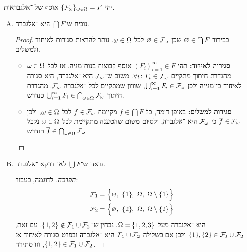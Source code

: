 \documentclass[]{../../../../tex/classes/homework}
\begin{document}
	\section{}
	יהי $\{\mathcal{F}_\omega\}_{\omega \in \Omega} = F$ אוסף של \ס־אלגבראות. 
	\begin{enumerate}[(A)]
		\item נוכיח ש־$\bigcap F$ היא \ס־אלגברה. \begin{proof}
			בבירור $\varnothing \in \bigcap F$ שכן $\varnothing \in \mathcal{F}_\omega$ לכל $\omega \in \Omega$. נותר להראות סגירות לאיחוד ולמשלים. 
			\begin{itemize}
				\item \textbf{סגירות לאיחוד: }תהי $(F_i)_{i =1}^{\infty} \in F$ אוסף קבוצות בנות־מניה. אז לכל $\omega \in \Omega $ מהגדרת חיתוך מתקיים $\forall i \colon F_i \in \mathcal{F}_\omega$. משום ש־$\mathcal{F}_\omega$ היא \ס־אלגברה, היא סגורה לאיחוד בן־מנייה ולכן $\bigcup_{i  = 1}^{\infty}F_i \in \mathcal{F}_\omega$, שוויון שמתקיים לכל \ס־אלגברה $\mathcal{F}_\omega$. מהגדרת חיתוך $\bigcup_{i = 1}^{\infty} F_i \in \bigcap_{\omega \in \Omega}\mathcal{F}_\omega $ כנדרש. 
				\item \textbf{סגירות למשלים: }באופן דומה, כל $f \in \bigcap F$ מקיימת $f \in \mathcal{F}_\omega$ לכל $\omega \in \Omega$, ולכן $\overline{f} \in \mathcal{F}_\omega$ כי $\mathcal{F}_\omega$ היא \ס־אלגברה, ולסיום משום שהטענה מתקיימת לכל $\omega \in \Omega$ נקבל $\overline{f} \in \bigcap_{\omega \in \Omega}\mathcal{F}_\omega$ כנדרש. 
			\end{itemize}\envendproof
		\end{proof}
		\item נראה ש־$\bigcup F$ לאו דווקא \ס־אלגברה. \begin{proof}[הפרכה]
			לדוגמה, בעבור: 
			\begin{gather*}
				\mathcal{F}_1 = \Big\{\varnothing,\ \{1\},\ \Omega,\ \Omega \setminus \{1\} \Big\} \\
				\mathcal{F}_2 = \Big\{\varnothing,\ \{2\},\ \Omega,\ \Omega \setminus \{2\} \Big\}
			\end{gather*}
			היא \ס־אלגברה מעל $\Omega = \{1, 2, 3\}$. נבחין ש־$\{1, 2\} \notin \mathcal{F}_1 \cup  \mathcal{F}_2$. עם זאת, $\{1\}, \{2\} \in \mathcal{F}_1 \cup \mathcal{F}_2$ ולכן אם בשלילה $\mathcal{F}_1 \cup \mathcal{F}_2$ היא \ס־אלגברה ובפרט סגורה לאיחוד אז $\{1, 2\} \in \mathcal{F}_1 \cup \mathcal{F}_2$, וזו סתירה. 
		\end{proof}
	\end{enumerate}
	
\end{document}
